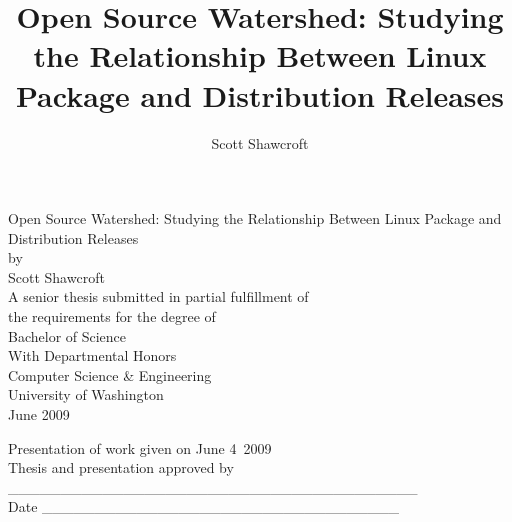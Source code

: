 \documentclass[letterpaper,10pt]{article}
\title{Open Source Watershed: Studying the Relationship Between Linux Package and Distribution Releases}
\author{Scott Shawcroft}
\begin{document}
\begin{titlepage}
\begin{center}
{\LARGE Open Source Watershed: Studying the Relationship Between Linux Package and Distribution Releases}\\
\vspace{\baselineskip}
by\\
\vspace{\baselineskip}
{\large Scott Shawcroft}\\
\vfill
A senior thesis submitted in partial fulfillment of\\
the requirements for the degree of\\
\vspace{\baselineskip}
{\large
Bachelor of Science \\
With Departmental Honors \\
\vspace{\baselineskip}
Computer Science \& Engineering \\
\vspace{\baselineskip}
University of Washington \\
\vspace{\baselineskip}
June 2009}\\

\end{center}
\vfill
Presentation of work given on June 4\, 2009\.\\
Thesis and presentation approved by \_\_\_\_\_\_\_\_\_\_\_\_\_\_\_\_\_\_\_\_\_\_\_\_\_\_\_\_\_\_\_\_\_\_\_\_\_\_\_\\
Date \_\_\_\_\_\_\_\_\_\_\_\_\_\_\_\_\_\_\_\_\_\_\_\_\_\_\_\_\_\_\_\_\_\_
\end{titlepage}


\tableofcontents{}

\newpage
\end{document}
